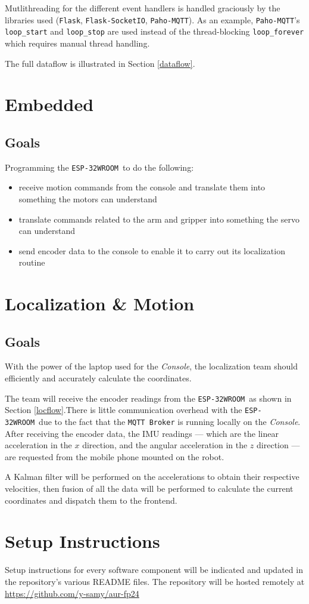 \documentclass[a4paper,12pt]{article}
\newcommand{\esp}{\texttt{ESP-32WROOM}}
\newcommand{\con}{\textit{Console}}
\begin{document}
Mutlithreading for the different event handlers is handled graciously by the libraries used (\texttt{Flask}, \texttt{Flask-SocketIO}, \texttt{Paho-MQTT}). As an example, \texttt{Paho-MQTT}'s \texttt{loop\_start} and \texttt{loop\_stop} are used instead of the thread-blocking \texttt{loop\_forever} which requires manual thread handling.

The full dataflow is illustrated in Section \ref{dataflow}.

\section{Embedded}
\subsection*{Goals}
Programming the \esp\ to do the following:
\begin{itemize}
    \item receive motion commands from the console and translate them into something the motors can understand
    \item translate commands related to the arm and gripper into something the servo can understand
    \item send encoder data to the console to enable it to carry out its localization routine
\end{itemize}
\section{Localization \& Motion}
\subsection*{Goals}

With the power of the laptop used for the \con, the localization team should efficiently and accurately calculate the coordinates.

The team will receive the encoder readings from the \esp\ as shown in Section \ref{locflow}.There is little communication overhead with the \esp\ due to the fact that the \texttt{MQTT Broker} is running locally on the \con.
After receiving the encoder data, the IMU readings --- which are the linear acceleration in the $x$ direction, and the angular acceleration in the $z$ direction --- are requested from the mobile phone mounted on the robot.

A Kalman filter will be performed on the accelerations to obtain their respective velocities, then fusion of all the data will be performed to calculate the current coordinates and dispatch them to the frontend.

\section{Setup Instructions}
Setup instructions for every software component will be indicated and updated in the repository's various README files.
The repository will be hosted remotely at \url{https://github.com/y-samy/aur-fp24}
\end{document}
